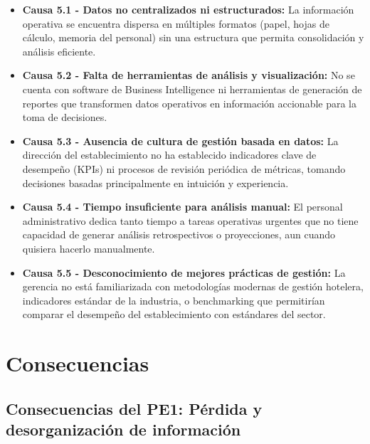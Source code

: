 	\begin{itemize}
		\item \textbf{Causa 5.1 - Datos no centralizados ni estructurados:} La información operativa se encuentra dispersa en múltiples formatos (papel, hojas de cálculo, memoria del personal) sin una estructura que permita consolidación y análisis eficiente.
		
		\item \textbf{Causa 5.2 - Falta de herramientas de análisis y visualización:} No se cuenta con software de Business Intelligence ni herramientas de generación de reportes que transformen datos operativos en información accionable para la toma de decisiones.
		
		\item \textbf{Causa 5.3 - Ausencia de cultura de gestión basada en datos:} La dirección del establecimiento no ha establecido indicadores clave de desempeño (KPIs) ni procesos de revisión periódica de métricas, tomando decisiones basadas principalmente en intuición y experiencia.
		
		\item \textbf{Causa 5.4 - Tiempo insuficiente para análisis manual:} El personal administrativo dedica tanto tiempo a tareas operativas urgentes que no tiene capacidad de generar análisis retrospectivos o proyecciones, aun cuando quisiera hacerlo manualmente.
		
		\item \textbf{Causa 5.5 - Desconocimiento de mejores prácticas de gestión:} La gerencia no está familiarizada con metodologías modernas de gestión hotelera, indicadores estándar de la industria, o benchmarking que permitirían comparar el desempeño del establecimiento con estándares del sector.
	\end{itemize}

\section{Consecuencias}
\label{sec:consecuencias}

\subsection{Consecuencias del PE1: Pérdida y desorganización de información}
\label{sec:consecuencias1}

